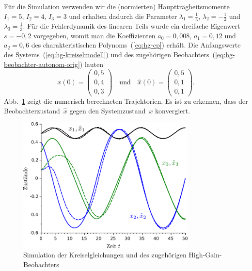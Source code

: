\begin{example}
\begin{maxima}\end{maxima}

Für die Simulation verwenden wir die (normierten) Hauptträgheitsmomente
$I_{1}=5$, $I_{2}=4$, $I_{3}=3$ und erhalten dadurch die Parameter
$\lambda_{1}=\tfrac{1}{5}$, $\lambda_{2}=-\tfrac{1}{2}$ und $\lambda_{3}=\tfrac{1}{3}$.
Für die Fehlerdynamik des linearen Teils wurde ein dreifache Eigenwert
$s=-0,2$ vorgegeben, womit man die Koeffizienten $a_{0}=0,008$,
$a_{1}=0,12$ und $a_{2}=0,6$ des charakteristischen Polynoms~(\ref{eq:hg-cp})
erhält. Die Anfangswerte des Systems~(\ref{eq:hg-kreiselmodell})
und des zugehörigen Beobachters~(\ref{eq:hg-beobachter-autonom-orig})
lauten 
\[
x(0)=\left(\begin{array}{c}
0,5\\
0,4\\
0,3
\end{array}\right)\quad\text{und}\quad\hat{x}(0)=\left(\begin{array}{c}
0,5\\
0,1\\
0,1
\end{array}\right).
\]
Abb.~\ref{fig:Kreisel-HG} zeigt die numerisch berechneten Trajektorien.
Es ist zu erkennen, dass der Beobachterzustand~$\hat{x}$ gegen den
Systemzustand~$x$ konvergiert.
\end{example}
\begin{figure}
\begin{centering}
\includegraphics[width=0.8\textwidth]{Kreisel_HG}
\par\end{centering}
\caption{Simulation der Kreiselgleichungen und des zugehörigen High-Gain-Beobachters\label{fig:Kreisel-HG}}

\end{figure}

